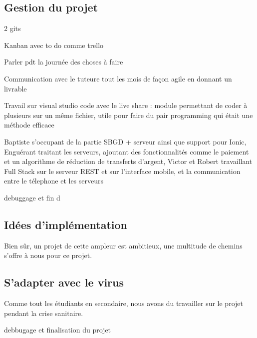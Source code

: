 \subsection{Gestion du projet}
2 gits

Kanban avec to do comme trello

Parler pdt la journée des choses à faire

Communication avec le tuteure tout les mois de façon agile en donnant un livrable

Travail sur visual studio code avec le live share : module permettant de coder à plusieurs sur un même fichier, utile pour faire du pair programming qui était une méthode efficace

Baptiste s'occupant de la partie SBGD + serveur ainsi que support pour Ionic,
Enguérant traitant les serveurs, ajoutant des fonctionnalités comme le paiement et un algorithme de réduction de transferts d'argent,
Victor et Robert travaillant Full Stack sur le serveur REST et sur l'interface mobile, et la communication entre le télephone et les serveurs

debuggage et fin d

\subsection{Idées d'implémentation}

Bien sûr, un projet de cette ampleur est ambitieux, une multitude de chemins s'offre à nous pour ce projet.

\subsection{S'adapter avec le virus}

Comme tout les étudiants en secondaire, nous avons du travailler sur le projet pendant la crise sanitaire. 

debbugage et finalisation du projet